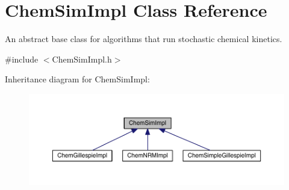 \hypertarget{classChemSimImpl}{\section{Chem\+Sim\+Impl Class Reference}
\label{classChemSimImpl}
}


An abstract base class for algorithms that run stochastic chemical kinetics.  




{\ttfamily \#include $<$Chem\+Sim\+Impl.\+h$>$}



Inheritance diagram for Chem\+Sim\+Impl\+:\nopagebreak
\begin{figure}[H]
\begin{center}
\leavevmode
\includegraphics[width=350pt]{classChemSimImpl__inherit__graph}
\end{center}
\end{figure}

